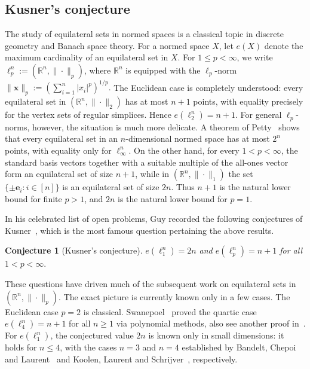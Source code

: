 \documentclass[11pt]{article}
\newtheorem{conj}[theorem]{Conjecture}
\theoremstyle{definition}
\begin{document}
\subsection{Kusner's conjecture}
The study of equilateral sets in normed spaces is a classical topic in discrete geometry and Banach space theory. 
For a normed space $X$, let $e(X)$ denote the maximum cardinality of an equilateral set in $X$.
For \(1\le p<\infty\), we write
$\ell_p^n := (\mathbb R^n,\|\cdot\|_p)$,
where \(\mathbb R^n\) is equipped with the \(\ell_p\)-norm
$\|\boldsymbol{x}\|_p
:=
\left(\sum_{i=1}^n |x_i|^p\right)^{1/p}.$
The Euclidean case is completely understood: every equilateral set in $(\mathbb{R}^{n},\|\cdot\|_2)$ has at most $n+1$ points, with equality precisely for the vertex sets of regular simplices. Hence
\(
e(\ell_2^n)=n+1.
\)
For general \(\ell_{p}\)-norms, however, the situation is much more delicate. 
A theorem of Petty~\cite{1971Petty} shows that every equilateral set in an $n$-dimensional normed space has at most $2^n$ points, with equality only for $\ell_\infty^n$. 
On the other hand, for every $1<p<\infty$, the standard basis vectors together with a suitable multiple of the all-ones vector form an equilateral set of size $n+1$, while in $(\mathbb{R}^{n},\|\cdot\|_1)$ the set $\{\pm \boldsymbol{e}_i:i\in[n]\}$ is an equilateral set of size $2n$. 
Thus $n+1$ is the natural lower bound for finite $p>1$, and $2n$ is the natural lower bound for $p=1$.

In his celebrated list of open problems, Guy recorded the following conjectures of Kusner~\cite{1983openProblem}, which is the most famous question pertaining the above results.
\begin{conj}[Kusner's conjecture]
    \(e(\ell_1^n)=2n\) and \(e(\ell_p^n)=n+1\) for all \(1<p<\infty.\)
\end{conj}
These questions have driven much of the subsequent work on equilateral sets in $(\mathbb{R}^{n},\|\cdot\|_p)$. The exact picture is currently known only in a few cases. 
The Euclidean case $p=2$ is classical. 
Swanepoel~\cite{2004ple2} proved the quartic case
\(
e(\ell_4^n)=n+1\) for all \(n\ge 1\) via polynomial methods, also see another proof in~\cite{2014Canada}. For $e(\ell_1^n)$, the conjectured value $2n$ is known only in small dimensions: it holds for $n\le 4$, with the cases $n=3$ and $n=4$ established by Bandelt, Chepoi and Laurent~\cite{1998DCG} and Koolen, Laurent and Schrijver~\cite{2000DCC}, respectively. 
\end{document}
